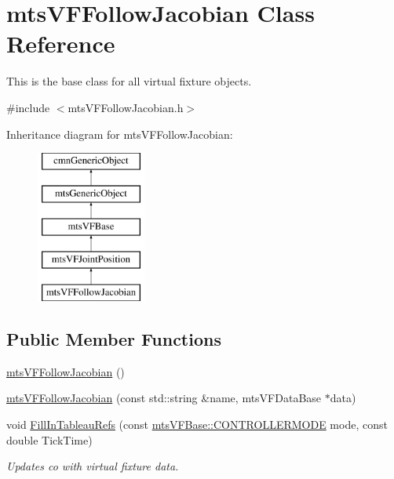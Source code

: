 \hypertarget{classmts_v_f_follow_jacobian}{\section{mts\-V\-F\-Follow\-Jacobian Class Reference}
\label{classmts_v_f_follow_jacobian}
}


This is the base class for all virtual fixture objects.  




{\ttfamily \#include $<$mts\-V\-F\-Follow\-Jacobian.\-h$>$}

Inheritance diagram for mts\-V\-F\-Follow\-Jacobian\-:\begin{figure}[H]
\begin{center}
\leavevmode
\includegraphics[height=5.000000cm]{df/d4f/classmts_v_f_follow_jacobian}
\end{center}
\end{figure}
\subsection*{Public Member Functions}
\begin{DoxyCompactItemize}
\item 
\hyperlink{classmts_v_f_follow_jacobian_a69d8261e7ff157c4cd16b0710736bf5a}{mts\-V\-F\-Follow\-Jacobian} ()
\item 
\hyperlink{classmts_v_f_follow_jacobian_a9e103c7132fb2dcc77d2a35d497759af}{mts\-V\-F\-Follow\-Jacobian} (const std\-::string \&name, mts\-V\-F\-Data\-Base $\ast$data)
\item 
void \hyperlink{classmts_v_f_follow_jacobian_a710e3cf5407eccac61f7f1d3a80d9bca}{Fill\-In\-Tableau\-Refs} (const \hyperlink{classmts_v_f_base_a742dd08f8b70bafeb746cec14d9ee974}{mts\-V\-F\-Base\-::\-C\-O\-N\-T\-R\-O\-L\-L\-E\-R\-M\-O\-D\-E} mode, const double Tick\-Time)
\begin{DoxyCompactList}\small\item\em Updates co with virtual fixture data. \end{DoxyCompactList}\end{DoxyCompactItemize}
